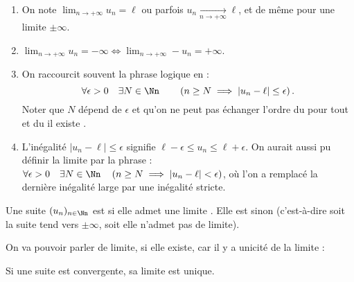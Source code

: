 \documentclass[class=report,crop=false]{standalone}
\begin{document}
\begin{remarque*}
\sauteligne
  \begin{enumerate}
    \item On note $\lim_{n\to +\infty}u_n=\ell$ ou parfois $u_n\xrightarrow[n\to +\infty]{} \ell$,
et de même pour une limite $\pm \infty$.

    \item $\lim_{n\to +\infty}u_n=-\infty\iff \lim_{n\to +\infty}-u_n=+\infty$.

    \item On raccourcit souvent la phrase logique en :
    $$\forall \epsilon >0 \quad \exists N \in \Nn  \qquad
    \left( n\geq N \implies \lvert u_n-\ell\rvert\leq\epsilon \right).$$
    Noter que $N$ dépend de $\epsilon$ et qu'on ne peut pas échanger l'ordre du \og pour tout \fg{}
    et du \og il existe \fg{}.



    \item L'inégalité $|u_n-\ell| \le \epsilon$ signifie $\ell-\epsilon \le u_n \le \ell +\epsilon$.
    On aurait aussi pu définir la limite par la phrase : $\forall \epsilon >0 \quad \exists N \in \Nn  \quad
    \left( n\geq N \implies \lvert u_n-\ell\rvert < \epsilon \right)$, où l'on a remplacé la dernière inégalité
    large par une inégalité stricte.

  \end{enumerate}
\end{remarque*}

\begin{definition}
  Une suite $(u_n)_{n\in \Nn}$ est  si elle admet une limite .
Elle est  sinon (c'est-à-dire soit la suite tend vers $\pm \infty$,
soit elle n'admet pas de limite).
\end{definition}



On va pouvoir parler de  limite, si elle existe, car il y a unicité de la limite :

\begin{proposition}
  Si une suite est convergente, sa limite est unique.
\end{proposition}
\end{document}
